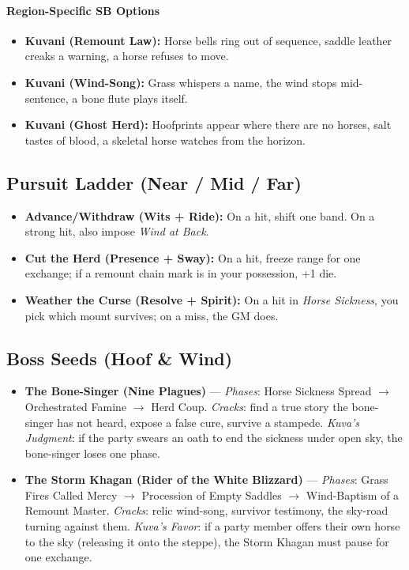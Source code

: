 \paragraph{Region-Specific SB Options}
\begin{itemize}
\item \textbf{Kuvani (Remount Law):} Horse bells ring out of sequence, saddle leather creaks a warning, a horse refuses to move.
\item \textbf{Kuvani (Wind-Song):} Grass whispers a name, the wind stops mid-sentence, a bone flute plays itself.
\item \textbf{Kuvani (Ghost Herd):} Hoofprints appear where there are no horses, salt tastes of blood, a skeletal horse watches from the horizon.
\end{itemize}

\subsection*{Pursuit Ladder (Near / Mid / Far)}
\begin{itemize}
\item \textbf{Advance/Withdraw (Wits + Ride):} On a hit, shift one band. On a strong hit, also impose \emph{Wind at Back}.
\item \textbf{Cut the Herd (Presence + Sway):} On a hit, freeze range for one exchange; if a remount chain mark is in your possession, +1 die.
\item \textbf{Weather the Curse (Resolve + Spirit):} On a hit in \emph{Horse Sickness}, you pick which mount survives; on a miss, the GM does.
\end{itemize}

\subsection*{Boss Seeds (Hoof \& Wind)}
\begin{itemize}
\item \textbf{The Bone-Singer (Nine Plagues)} --- \emph{Phases}: Horse Sickness Spread \(\rightarrow\) Orchestrated Famine \(\rightarrow\) Herd Coup. \emph{Cracks}: find a true story the bone-singer has not heard, expose a false cure, survive a stampede. \emph{Kuva's Judgment}: if the party swears an oath to end the sickness under open sky, the bone-singer loses one phase.
\item \textbf{The Storm Khagan (Rider of the White Blizzard)} --- \emph{Phases}: Grass Fires Called Mercy \(\rightarrow\) Procession of Empty Saddles \(\rightarrow\) Wind-Baptism of a Remount Master. \emph{Cracks}: relic wind-song, survivor testimony, the sky-road turning against them. \emph{Kuva's Favor}: if a party member offers their own horse to the sky (releasing it onto the steppe), the Storm Khagan must pause for one exchange.
\end{itemize}

